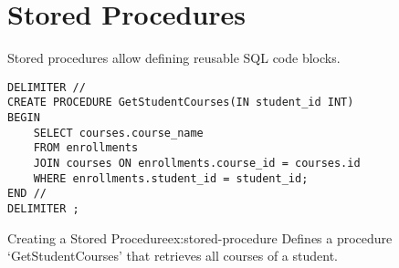 \section{Stored Procedures}

Stored procedures allow defining reusable SQL code blocks.

\begin{verbatim}
DELIMITER //
CREATE PROCEDURE GetStudentCourses(IN student_id INT)
BEGIN
    SELECT courses.course_name 
    FROM enrollments 
    JOIN courses ON enrollments.course_id = courses.id 
    WHERE enrollments.student_id = student_id;
END //
DELIMITER ;
\end{verbatim}

\begin{exampletcb}{Creating a Stored Procedure}{ex:stored-procedure}
Defines a procedure `GetStudentCourses' that retrieves all courses of a student.
\end{exampletcb}
